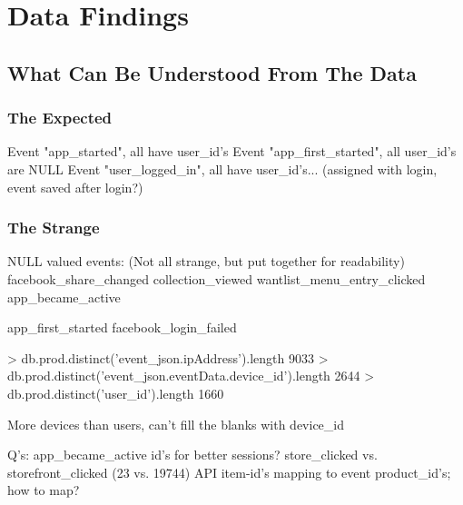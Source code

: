 


\section{Data Findings}
\subsection{What Can Be Understood From The Data}


\subsubsection{The Expected}
Event "app\_started", all have user\_id's
Event "app\_first\_started", all user\_id's are NULL
Event "user\_logged\_in", all have user\_id's... (assigned with login, event saved after login?)

\subsubsection{The Strange}
NULL valued events: (Not all strange, but put together for readability)
facebook\_share\_changed
collection\_viewed
wantlist\_menu\_entry\_clicked
app\_became\_active

app\_first\_started
facebook\_login\_failed

> db.prod.distinct('event\_json.ipAddress').length
9033
> db.prod.distinct('event\_json.eventData.device\_id').length
2644
> db.prod.distinct('user\_id').length
1660

More devices than users, can't fill the blanks with device\_id

Q's:
    app\_became\_active id's for better sessions?
    store\_clicked vs. storefront\_clicked (23 vs. 19744)
    API item-id's mapping to event product\_id's; how to map?

